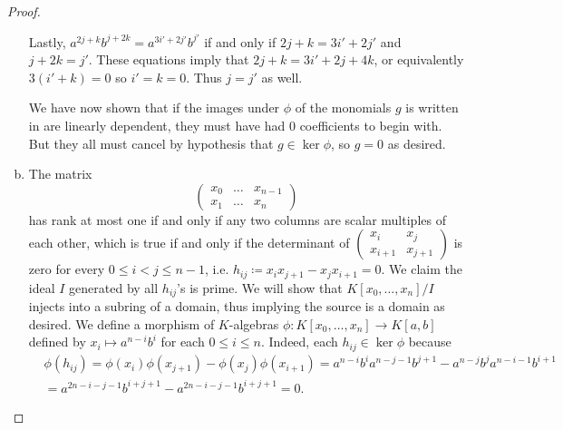 \documentclass{article}
\theoremstyle{definition} %
\begin{document}
\begin{proof}
\begin{enumerate}[(a)]
        \vspace{0.1in}
        Lastly, $a^{2j+k}b^{j+2k}=a^{3i'+2j'} b^{j'}$ if and only if $2j+k=3i'+2j'$ and $j+2k=j'$. These equations imply that $2j+k=3i'+2j+4k$, or equivalently $3(i'+k)=0$ so $i'=k=0$. Thus $j=j'$ as well.

        \vspace{0.1in}
        We have now shown that if the images under $\phi$ of the monomials $g$ is written in are linearly dependent, they must have had $0$ coefficients to begin with. But they all must cancel by hypothesis that $g\in \ker \phi$, so $g=0$ as desired.
        \item The matrix 
        \[
        \begin{pmatrix}
            x_0 & \dots & x_{n-1}\\
            x_1 & \dots & x_{n}
        \end{pmatrix}
        \]
        has rank at most one if and only if any two columns are scalar multiples of each other, which is true if and only if the determinant of $\begin{pmatrix}
            x_i & x_{j}\\
            x_{i+1} & x_{j+1}
        \end{pmatrix}$
        is zero for every $0\le i<j \le n-1$, i.e. $h_{ij} \coloneqq x_i x_{j+1}- x_j x_{i+1}=0$. We claim the ideal $I$ generated by all $h_{ij}$'s is prime. We will show that $K[x_0,\dots, x_n]/I$ injects into a subring of a domain, thus implying the source is a domain as desired. We define a morphism of $K$-algebras $\phi:K[x_0,\dots,x_{n}]\to K[a,b]$ defined by $x_i \mapsto a^{n-i} b^{i}$ for each $0\le i\le n$. Indeed, each $h_{ij}\in \ker \phi$ because \begin{align*}
            &\phi(h_{ij})=\phi(x_i) \phi(x_{j+1}) - \phi(x_j) \phi(x_{i+1}) = a^{n-i} b^i a^{n-j-1} b^{j+1} - a^{n-j} b^j a^{n-i-1} b^{i+1}\\
            &=a^{2n-i-j-1} b^{i+j+1}- a^{2n-i-j-1} b^{i+j+1}=0.
        \end{align*}

\end{enumerate}
\end{proof}
\end{document}
